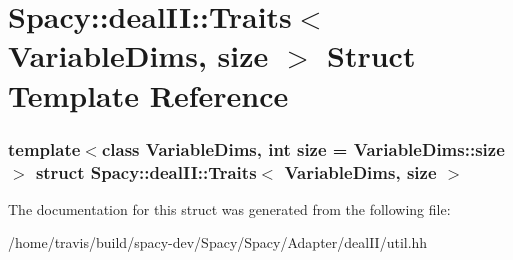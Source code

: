 \hypertarget{structSpacy_1_1dealII_1_1Traits}{\section{\-Spacy\-:\-:deal\-I\-I\-:\-:\-Traits$<$ \-Variable\-Dims, size $>$ \-Struct \-Template \-Reference}
\label{structSpacy_1_1dealII_1_1Traits}
}
\subsubsection*{template$<$class Variable\-Dims, int size = \-Variable\-Dims\-::size$>$ struct Spacy\-::deal\-I\-I\-::\-Traits$<$ Variable\-Dims, size $>$}



\-The documentation for this struct was generated from the following file\-:\begin{DoxyCompactItemize}
\item 
/home/travis/build/spacy-\/dev/\-Spacy/\-Spacy/\-Adapter/deal\-I\-I/util.\-hh\end{DoxyCompactItemize}
